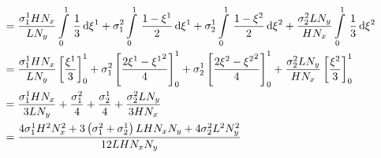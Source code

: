 \begin{equation}
\begin{aligned}
    &=\dfrac{\conductivitytensorsymbol^{1}_{1} H N_{x}}{L N_{y}}\gint{0}{1}{\dfrac{1}{3}}{\xione}
    +\conductivitytensorsymbol^{2}_{1}\gint{0}{1}{\dfrac{1-\xione}{2}}{\xione}
    +\conductivitytensorsymbol^{1}_{2}\gint{0}{1}{\dfrac{1-\xitwo}{2}}{\xitwo}
    +\dfrac{\conductivitytensorsymbol^{2}_{2} L N_{y}}{H N_{x}}\gint{0}{1}{\dfrac{1}{3}}{\xitwo} \\
    &=\dfrac{\conductivitytensorsymbol^{1}_{1} H N_{x}}{L N_{y}}\sqbrac{\dfrac{\xione}{3}}^{1}_{0}
    +\conductivitytensorsymbol^{2}_{1}\sqbrac{\dfrac{2\xione-\xionesq}{4}}^{1}_{0}
    +\conductivitytensorsymbol^{1}_{2}\sqbrac{\dfrac{2\xitwo-\xitwosq}{4}}^{1}_{0}
    +\dfrac{\conductivitytensorsymbol^{2}_{2} L N_{y}}{H N_{x}}\sqbrac{\dfrac{\xitwo}{3}}^{1}_{0} \\
    &=\dfrac{\conductivitytensorsymbol^{1}_{1} H N_{x}}{3 L N_{y}}+\dfrac{\conductivitytensorsymbol^{2}_{1}}{4}+
    \dfrac{\conductivitytensorsymbol^{1}_{2}}{4}+\dfrac{\conductivitytensorsymbol^{2}_{2} L N_{y}}{3 H N_{x}} \\
    &=\dfrac{4\conductivitytensorsymbol^{1}_{1}H^{2}N_{x}^{2}+3\pbrac{\conductivitytensorsymbol^{2}_{1}+
        \conductivitytensorsymbol^{1}_{2}}L H N_{x} N_{y}+4\conductivitytensorsymbol^{2}_{2}L^{2}N_{y}^{2}}{12 L H N_{x} N_{y}}
  \end{aligned}
\end{equation}

